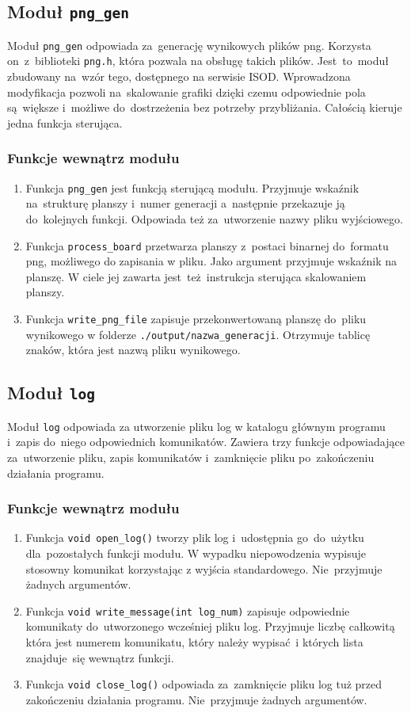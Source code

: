 \documentclass[a4paper,11pt]{article}
\begin{document}
		\subsection{Moduł \texttt{png\_gen}}
		  Moduł \texttt{png\_gen} odpowiada za~generację wynikowych plików png. Korzysta on~z~biblioteki \texttt{png.h}, która pozwala na obsługę takich plików. Jest~to~moduł zbudowany na~wzór tego, dostępnego na serwisie ISOD. Wprowadzona modyfikacja pozwoli na~skalowanie grafiki dzięki czemu odpowiednie pola są~większe i~możliwe do~dostrzeżenia bez potrzeby przybliżania. Całością kieruje jedna funkcja sterująca.
		  \subsubsection{Funkcje wewnątrz modułu}
		    \begin{enumerate}
		      \item Funkcja \texttt{png\_gen} jest funkcją sterującą modułu. Przyjmuje wskaźnik na~strukturę planszy i~numer generacji a~następnie przekazuje ją do~kolejnych funkcji. Odpowiada też za~utworzenie nazwy pliku wyjściowego.
		      \item Funkcja \texttt{process\_board} przetwarza planszy z~postaci binarnej do~formatu png, możliwego do zapisania w pliku. Jako argument przyjmuje wskaźnik na planszę. W ciele jej zawarta jest~też~instrukcja sterująca skalowaniem planszy.
		      \item Funkcja \texttt{write\_png\_file} zapisuje przekonwertowaną planszę do~pliku wynikowego w folderze \texttt{./output/nazwa\_generacji}. Otrzymuje tablicę znaków, która jest nazwą pliku wynikowego.
		    \end{enumerate}
	    \newpage
		\subsection{Moduł \texttt{log}}
		  Moduł \texttt{log} odpowiada za utworzenie pliku log w katalogu głównym programu i~zapis do~niego odpowiednich komunikatów. Zawiera trzy funkcje odpowiadające za~utworzenie pliku, zapis komunikatów i~zamknięcie pliku po~zakończeniu działania programu.
		  \subsubsection{Funkcje wewnątrz modułu}
		    \begin{enumerate}
		      \item Funkcja \texttt {void open\_log()} tworzy plik log i~udostępnia go~do~użytku dla~pozostałych funkcji modułu. W wypadku niepowodzenia wypisuje stosowny komunikat korzystając z wyjścia standardowego. Nie~przyjmuje żadnych argumentów.
		      \item Funkcja \texttt {void write\_message(int log\_num)} zapisuje odpowiednie komunikaty do~utworzonego wcześniej pliku log. Przyjmuje liczbę całkowitą która jest numerem komunikatu, który należy wypisać~i których lista znajduje~się wewnątrz funkcji.
		      \item Funkcja \texttt{void close\_log()} odpowiada za~zamknięcie pliku log tuż przed zakończeniu działania programu. Nie~przyjmuje żadnych argumentów.
		    \end{enumerate}
\end{document}
